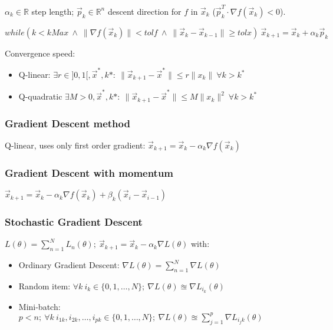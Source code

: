 \documentclass[]{article}
\begin{document}
	$\alpha_k \in \mathbb{R}$ step length; $\vec{p}_k \in \mathbb{R}^n$ descent direction for $f$ in $\vec{x}_k$ ($\vec{p}_k^T \cdot \nabla f(\vec{x}_k) < 0$).
	
	$while ( k < kMax \ \land \ \lVert \nabla f(\vec{x}_k) \rVert < tolf \ \land \ \lVert \vec{x}_k - \vec{x}_{k-1} \rVert \ge tolx ) \  \vec{x}_{k+1} = \vec{x}_k + \alpha_k \vec{p}_k$
	
	Convergence speed:
	\begin{itemize}
		\item Q-linear: $\exists r\in]0,1[, \vec{x}^*, k*: \  \lVert \vec{x}_{k+1}-\vec{x}^* \rVert \le r \lVert x_k \rVert \ \forall k > k^*$
		\item Q-quadratic $\exists M>0, \vec{x}^*, k*: \  \lVert \vec{x}_{k+1}-\vec{x}^* \rVert \le M \lVert x_k \rVert^2 \ \forall k > k^*$
	\end{itemize}
	
	\subsubsection{Gradient Descent method}
		
	Q-linear, uses only first order gradient: $\vec{x}_{k+1} = \vec{x}_k - \alpha_k \nabla f(\vec{x}_k)$
	
	\subsubsection{Gradient Descent with momentum}
	
	$\vec{x}_{k+1} = \vec{x}_k - \alpha_k \nabla f(\vec{x}_k) + \beta_k (\vec{x}_i - \vec{x}_{i-1})$
	
	\subsubsection{Stochastic Gradient Descent}
	
	$L(\theta)=\sum\limits_{n=1}^N L_n(\theta); \ \vec{x}_{k+1} = \vec{x}_k - \alpha_k \nabla L(\theta)$ with:
	\begin{itemize}
		\item Ordinary Gradient Descent: $\nabla L(\theta) = \sum\limits_{n=1}^N \nabla L(\theta)$ 
		\item Random item: $\forall k \ i_k\in\{0,1,\dots,N\}; \ \nabla L(\theta) \approxeq \nabla L_{i_k}(\theta)$
		\item Mini-batch: $p < n; \ \forall k \ i_{1k},i_{2k},\dots,i_{pk}\in\{0,1,\dots,N\}; \ \nabla L(\theta) \approxeq \sum\limits_{j=1}^p \nabla L_{i_jk}(\theta)$
	\end{itemize}
	 
\end{document}

